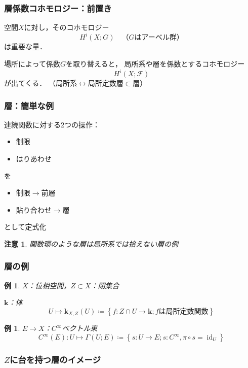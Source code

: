 \documentclass[dvipdfmx,12pt,aspectratio=169,leqno]{beamer}%
\newcommand{\kk}{\mathbf{k}}
\numberwithin{equation}{subsection}
\newcommand{\id}{\mathop{\mathrm{id}}\nolimits}
\theoremstyle{mystyle}
\newtheorem{EG}[AXM]{例}
\newtheorem{RMK}[AXM]{注意}
\begin{document}
\begin{frame}
    \frametitle{層係数コホモロジー：前置き}
    空間\(X\)に対し，そのコホモロジー
    \[
        H^i(X;G)\quad\text{（\(G\)はアーベル群）}
    \]は重要な量．
    
    場所によって係数\(G\)を取り替えると，
    局所系や層を係数とするコホモロジー
    \[
        H^i(X;\mathscr{F})
    \]が出てくる．
    （\(
        \text{局所系}
        \leftrightarrow
        \text{局所定数層}
        \subset\text{層}
    \)）
\end{frame}

\begin{frame}
    \frametitle{層：簡単な例}

    連続関数に対する2つの操作：
    \begin{itemize}
        \item 制限
        \item はりあわせ
    \end{itemize}
    を
    \begin{itemize}
        \item 制限\(\to\)前層
        \item 貼り合わせ\(\to\)層
    \end{itemize}
    として定式化

    \begin{RMK}
        関数環のような層は局所系では拾えない層の例
    \end{RMK}
\end{frame}



\begin{frame}
    \frametitle{層の例}
    \begin{EG}\label{eg:sheaf}
        \(X\)：位相空間，\(Z\subset X\)：閉集合
        
        \(\kk\)：体
        \[
            U\mapsto
            \kk_{X,Z}(U)\coloneqq\left\{
                f\colon Z\cap U\to\kk; 
                \text{\(f\)は局所定数関数}
            \right\}
        \]
    \end{EG}    
    \begin{EG}
        \(E\to X\)：\(C^{\infty}\)ベクトル束
        \[
            C^{\infty}(E)\colon U\mapsto \Gamma(U;E)\coloneqq
            \left\{s\colon U\to E;s\colon C^{\infty}, \pi\circ s=\id_U\right\}
        \]%
    \end{EG}
\end{frame}
\begin{frame}
    \frametitle{\(Z\)に台を持つ層のイメージ}
\end{frame}
\end{document}
